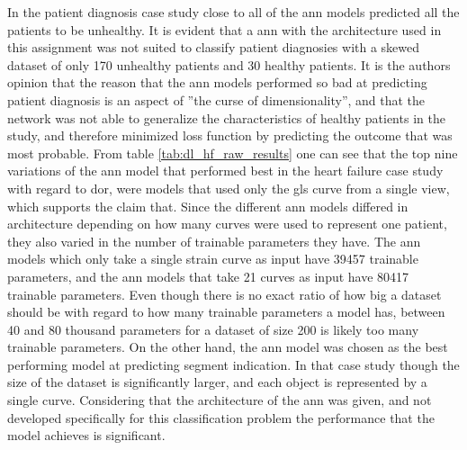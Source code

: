 In the patient diagnosis case study close to all of the \acrshort{ann} models predicted all the patients to be unhealthy. It is evident that a \acrshort{ann} with the architecture used in this assignment was not suited to classify patient diagnosies with a skewed dataset of only 170 unhealthy patients and 30 healthy patients. It is the authors opinion that the reason that the \acrshort{ann} models performed so bad at predicting patient diagnosis is an aspect of ''the curse of dimensionality'', and that the network was not able to generalize the characteristics of healthy patients in the study, and therefore minimized loss function by predicting the outcome that was most probable. From table \ref{tab:dl_hf_raw_results} one can see that the top nine variations of the \acrshort{ann} model that performed best in the heart failure case study with regard to \acrshort{dor}, were models that used only the \acrshort{gls} curve from a single view, which supports the claim that. Since the different \acrshort{ann} models differed in architecture depending on how many curves were used to represent one patient, they also varied in the number of trainable parameters they have. The \acrshort{ann} models which only take a single strain curve as input have 39457 trainable parameters, and the \acrshort{ann} models that take 21 curves as input have 80417 trainable parameters. Even though there is no exact ratio of how big a dataset should be with regard to how many trainable parameters a model has, between 40 and 80 thousand parameters for a dataset of size 200 is likely too many trainable parameters. On the other hand, the \acrshort{ann} model was chosen as the best performing model at predicting segment indication. In that case study though the size of the dataset is significantly larger, and each object is represented by a single curve. Considering that the architecture of the \acrshort{ann} was given, and not developed specifically for this classification problem the performance that the model achieves is significant. \bigskip
